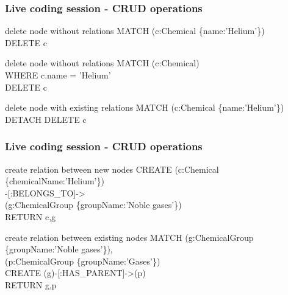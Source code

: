 \documentclass[12pt]{beamer}
\begin{document}
    \begin{frame}
        \frametitle{Live coding session - CRUD operations}
        \begin{block}{delete node without relations}
            MATCH (c:Chemical \{name:'Helium'\})\\
            \hspace{1cm} DELETE c
        \end{block}
        \begin{block}{delete node without relations}
            MATCH (c:Chemical)\\
            \hspace{1cm} WHERE c.name = 'Helium'\\
            \hspace{1cm} DELETE c
        \end{block}
        \begin{block}{delete node with existing relations}
            MATCH (c:Chemical \{name:'Helium'\})\\
            \hspace{1cm} DETACH DELETE c\\
        \end{block}
    \end{frame}
    
    \begin{frame}
        \frametitle{Live coding session - CRUD operations}
        \begin{block}{create relation between new nodes}
            CREATE (c:Chemical \{chemicalName:'Helium'\})\\
            \hspace{1cm} -[:BELONGS\_TO]-\textgreater\\
            \hspace{1cm} (g:ChemicalGroup \{groupName:'Noble gases'\})\\ 
            RETURN c,g
        \end{block}
        \begin{block}{create relation between existing nodes}
            MATCH (g:ChemicalGroup \{groupName:'Noble gases'\}),\\
            \hspace{1.4cm} (p:ChemicalGroup \{groupName:'Gases'\})\\
            CREATE (g)-[:HAS\_PARENT]-\textgreater(p)\\ 
            RETURN g,p
        \end{block}
    \end{frame}
    
\end{document}
